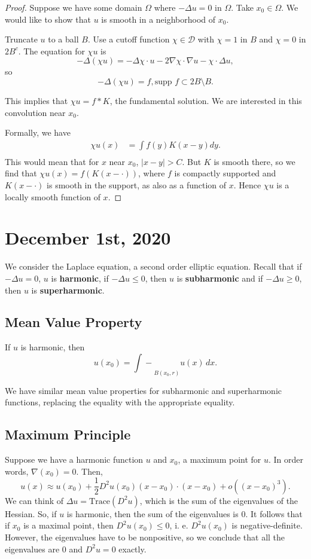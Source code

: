 \documentclass[12pt]{scrartcl}
\let \mc \mathcal
\newcommand{\supp}{\text{supp }}
\newcommand{\aint}{\mathrel{\int\!\!\!\!\!\!-}}
\let \grad \nabla
\begin{document}
\begin{proof}
Suppose we have some domain $\Omega$ where $-\Delta u  = 0$ in $\Omega$.  Take $x_0 \in \Omega$.  We would like to show that $u$ is smooth in a neighborhood of $x_0$.

Truncate $u$ to a ball $B$.  Use a cutoff function $\chi \in \mc D$ with $\chi = 1$ in $B$ and $\chi = 0$ in $2B^c$.  The equation for $\chi u$ is 
$$-\Delta(\chi u) = -\Delta \chi \cdot u - 2\grad \chi\cdot \grad u - \chi \cdot \Delta u,$$
so $$-\Delta (\chi u) = f, \supp f \subset 2B\setminus B.$$

This implies that $\chi u = f * K$, the fundamental solution.  We are interested in this convolution near $x_0$.

Formally, we have 
\begin{align*}
\chi u ( x) &= \int f(y) K(x-y) dy.\\
\end{align*}
This would mean that for $x$ near $x_0$, $|x-y| > C$.  But $K$ is smooth there, so we find that $\chi u(x) = f(K(x - \cdot))$, where $f$ is compactly supported and $K(x - \cdot)$ is smooth in the support, as also as a function of $x$.  Hence $\chi u$ is a locally smooth function of $x$.
\end{proof}
\pagebreak
\section{December 1st, 2020}
We consider the Laplace equation, a second order elliptic equation.  Recall that if $-\Delta u = 0$, $u$ is \textbf{harmonic}, if $-\Delta u \le 0$, then $u$ is \textbf{subharmonic} and if $-\Delta u \ge 0$, then $u$ is \textbf{superharmonic}.

\subsection{Mean Value Property}
If $u$ is harmonic, then 
$$u(x_0) = \aint_{B(x_0, r)} u(x)\,dx.$$

We have similar mean value properties for subharmonic and superharmonic functions, replacing the equality with the appropriate equality.

\subsection{Maximum Principle}
Suppose we have a harmonic function $u$ and $x_0$, a maximum point for $u$.  In order words, $\grad(x_0) = 0$.  Then,
$$u(x) \approx u(x_0) + \dfrac{1}{2}D^2 u(x_0)(x-x_0)\cdot (x - x_0) + o((x - x_0)^3).$$
We can think of $\Delta u = \text{Trace}(D^2 u)$, which is the sum of the eigenvalues of the Hessian.  So, if $u$ is harmonic, then the sum of the eigenvalues is $0$.  It follows that if $x_0$ is a maximal point, then $D^2u(x_0) \le 0$, i. e. $D^2u(x_0)$ is negative-definite.  However, the eigenvalues have to be nonpositive, so we conclude that all the eigenvalues are $0$ and $D^2 u = 0$ exactly.
\end{document}
